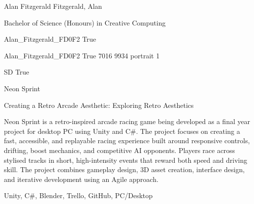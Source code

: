 \documentclass[twoside]{report}
\begin{document}
\begingroup{}\relax



\def\Key{Alan_Fitzgerald_FD0F2}

{Alan Fitzgerald}
{Fitzgerald, Alan}

{Bachelor of Science (Honours) in Creative Computing}

{Alan_Fitzgerald_FD0F2}
{True}

{Alan_Fitzgerald_FD0F2}
{True}
{7016}
{9934}
{portrait}
{1}

{SD}
{True}

{Neon Sprint}

{Creating a Retro Arcade Aesthetic: Exploring Retro Aesthetics}

{Neon Sprint is a retro-inspired arcade racing game being developed as a final year project for desktop PC using Unity and C\#. The project focuses on creating a fast, accessible, and replayable racing experience built around responsive controls, drifting, boost mechanics, and competitive AI opponents. Players race across stylised tracks in short, high-intensity events that reward both speed and driving skill. The project combines gameplay design, 3D asset creation, interface design, and iterative development using an Agile approach.}

{Unity, C\#, Blender, Trello, GitHub, PC/Desktop}
\end{document}
